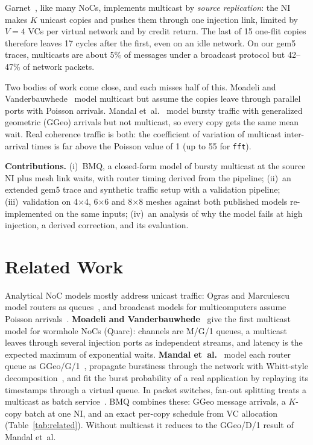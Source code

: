 \documentclass[conference]{IEEEtran}
\begin{document}
Garnet~\cite{agarwal2009garnet}, like many NoCs, implements multicast by \emph{source replication}: the NI makes $K$ unicast copies and pushes them through one injection link, limited by $V{=}4$ VCs per virtual network and by credit return. The last of 15 one-flit copies therefore leaves 17 cycles after the first, even on an idle network. On our gem5 traces, multicasts are about 5\% of messages under a broadcast protocol but 42--47\% of network packets.

Two bodies of work come close, and each misses half of this. Moadeli and Vanderbauwhede~\cite{moadeli2009multicast} model multicast but assume the copies leave through parallel ports with Poisson arrivals. Mandal et~al.~\cite{mandal2020bursty} model bursty traffic with generalized geometric (GGeo) arrivals but not multicast, so every copy gets the same mean wait. Real coherence traffic is both: the coefficient of variation of multicast inter-arrival times is far above the Poisson value of 1 (up to 55 for \texttt{fft}).

\textbf{Contributions.} (i)~BMQ, a closed-form model of bursty multicast at the source NI plus mesh link waits, with router timing derived from the pipeline; (ii)~an extended gem5 trace and synthetic traffic setup with a validation pipeline; (iii)~validation on 4$\times$4, 6$\times$6 and 8$\times$8 meshes against both published models re-implemented on the same inputs; (iv)~an analysis of why the model fails at high injection, a derived correction, and its evaluation.

\section{Related Work}
Analytical NoC models mostly address unicast traffic: Ogras and Marculescu model routers as queues~\cite{ogras2007router}, and broadcast models for multicomputers assume Poisson arrivals~\cite{shahrabi2003hypercube}. \textbf{Moadeli and Vanderbauwhede}~\cite{moadeli2009multicast} give the first multicast model for wormhole NoCs (Quarc): channels are M/G/1 queues, a multicast leaves through several injection ports as independent streams, and latency is the expected maximum of exponential waits. \textbf{Mandal et~al.}~\cite{mandal2020bursty,mandal2021wrr} model each router queue as GGeo/G/1~\cite{kouvatsos1994entropy}, propagate burstiness through the network with Whitt-style decomposition~\cite{whitt1983qna}, and fit the burst probability of a real application by replaying its timestamps through a virtual queue. In packet switches, fan-out splitting treats a multicast as batch service~\cite{hui1990multicast}. BMQ combines these: GGeo message arrivals, a $K$-copy batch at one NI, and an exact per-copy schedule from VC allocation (Table~\ref{tab:related}). Without multicast it reduces to the GGeo/D/1 result of Mandal et~al.
\end{document}
